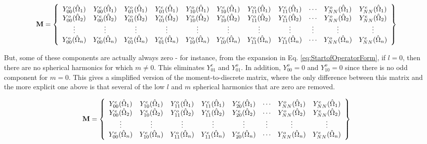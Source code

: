 \documentclass[10pt]{article}
\begin{document}
\begin{equation}
\textbf{M}=\left\{
\begin{array}{*{13}c}
Y_{00}^o(\hat{\Omega}_1) & Y_{00}^e(\hat{\Omega}_1) & Y_{01}^o(\hat{\Omega}_1) & Y_{01}^e(\hat{\Omega}_1) & Y_{10}^o(\hat{\Omega}_1) & Y_{10}^e(\hat{\Omega}_1) & Y_{11}^o(\hat{\Omega}_1) & Y_{11}^e(\hat{\Omega}_1) & \cdots & Y_{NN}^o(\hat{\Omega}_1) & Y_{NN}^e(\hat{\Omega}_1)\\
Y_{00}^o(\hat{\Omega}_2) & Y_{00}^e(\hat{\Omega}_2) & Y_{01}^o(\hat{\Omega}_2) & Y_{01}^e(\hat{\Omega}_2) & Y_{10}^o(\hat{\Omega}_2) & Y_{10}^e(\hat{\Omega}_2) & Y_{11}^o(\hat{\Omega}_2) & Y_{11}^e(\hat{\Omega}_2) & \cdots & Y_{NN}^o(\hat{\Omega}_2) & Y_{NN}^e(\hat{\Omega}_2)\\
\vdots & \vdots & \vdots & \vdots & \vdots & \vdots & \vdots & \vdots & \vdots & \vdots & \vdots \\
Y_{00}^o(\hat{\Omega}_n) & Y_{00}^e(\hat{\Omega}_n) & Y_{01}^o(\hat{\Omega}_n) & Y_{01}^e(\hat{\Omega}_n) & Y_{10}^o(\hat{\Omega}_n) & Y_{10}^e(\hat{\Omega}_n) & Y_{11}^o(\hat{\Omega}_n) & Y_{11}^e(\hat{\Omega}_n) & \cdots & Y_{NN}^o(\hat{\Omega}_n) & Y_{NN}^e(\hat{\Omega}_n)\\
\end{array}\right\}
\end{equation}

But, some of these components are actually always zero - for instance, from the expansion in Eq. \eqref{eq:StartofOperatorForm}, if \(l=0\), then there are no spherical harmonics for which \(m\neq0\). This eliminates \(Y_{01}^e\) and \(Y_{01}^o\). In addition, \(Y_{00}^o=0\) and \(Y_{10}^o=0\) since there is no odd component for \(m=0\). This gives a simplified version of the moment-to-discrete matrix, where the only difference between this matrix and the more explicit one above is that several of the low \(l\) and \(m\) spherical harmonics that are zero are removed.

\begin{equation}
\textbf{M}=\left\{
\begin{array}{*{13}c}
Y_{00}^e(\hat{\Omega}_1)  & Y_{10}^e(\hat{\Omega}_1) & Y_{11}^o(\hat{\Omega}_1) & Y_{11}^e(\hat{\Omega}_1) & Y_{20}^e(\hat{\Omega}_1) & \cdots & Y_{NN}^o(\hat{\Omega}_1) & Y_{NN}^e(\hat{\Omega}_1)\\
Y_{00}^e(\hat{\Omega}_2)  & Y_{10}^e(\hat{\Omega}_2) & Y_{11}^o(\hat{\Omega}_2) & Y_{11}^e(\hat{\Omega}_2) & Y_{20}^e(\hat{\Omega}_2) & \cdots & Y_{NN}^o(\hat{\Omega}_2) & Y_{NN}^e(\hat{\Omega}_2)\\
\vdots & \vdots & \vdots & \vdots & \vdots & \vdots & \vdots & \vdots \\
Y_{00}^e(\hat{\Omega}_n) & Y_{10}^e(\hat{\Omega}_n) & Y_{11}^o(\hat{\Omega}_n) & Y_{11}^e(\hat{\Omega}_n) & Y_{20}^e(\hat{\Omega}_n) & \cdots & Y_{NN}^o(\hat{\Omega}_n) & Y_{NN}^e(\hat{\Omega}_n)\\
\end{array}\right\}
\end{equation}
\end{document}
